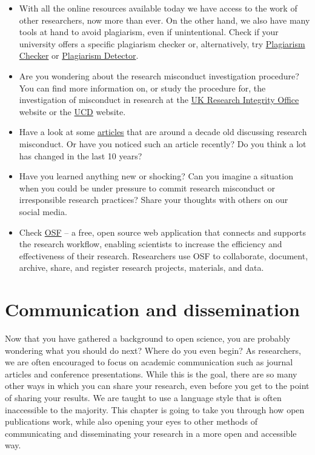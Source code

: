 \documentclass[
]{book}
\begin{document}
\begin{itemize}
\item
  With all the online resources available today we have access to the work of other researchers, now more than ever. On the other hand, we also have many tools at hand to avoid plagiarism, even if unintentional. Check if your university offers a specific plagiarism checker or, alternatively, try \href{https://www.plagiarismchecker.co/}{Plagiarism Checker} or \href{https://plagiarismdetector.net/}{Plagiarism Detector}.
\item
  Are you wondering about the research misconduct investigation procedure? You can find more information on, or study the procedure for, the investigation of misconduct in research at the \href{https://ukrio.org/publications/misconduct-investigation-procedure/}{UK Research Integrity Office} website or the \href{https://www.ucd.ie/researchintegrity/}{UCD} website.
\item
  Have a look at some \href{https://epigeum.com/downloads/ri/ri_in_the_news/}{articles} that are around a decade old discussing research misconduct. Or have you noticed such an article recently? Do you think a lot has changed in the last 10 years?
\item
  Have you learned anything new or shocking? Can you imagine a situation when you could be under pressure to commit research misconduct or irresponsible research practices? Share your thoughts with others on our social media.
\item
  Check \href{https://osf.io/}{OSF} -- a free, open source web application that connects and supports the research workflow, enabling scientists to increase the efficiency and effectiveness of their research. Researchers use OSF to collaborate, document, archive, share, and register research projects, materials, and data.
\end{itemize}

\hypertarget{communication-and-dissemination}{%
\chapter{Communication and dissemination}\label{communication-and-dissemination}}

Now that you have gathered a background to open science, you are probably wondering what you should do next? Where do you even begin? As researchers, we are often encouraged to focus on academic communication such as journal articles and conference presentations. While this is the goal, there are so many other ways in which you can share your research, even before you get to the point of sharing your results. We are taught to use a language style that is often inaccessible to the majority. This chapter is going to take you through how open publications work, while also opening your eyes to other methods of communicating and disseminating your research in a more open and accessible way.
\end{document}
